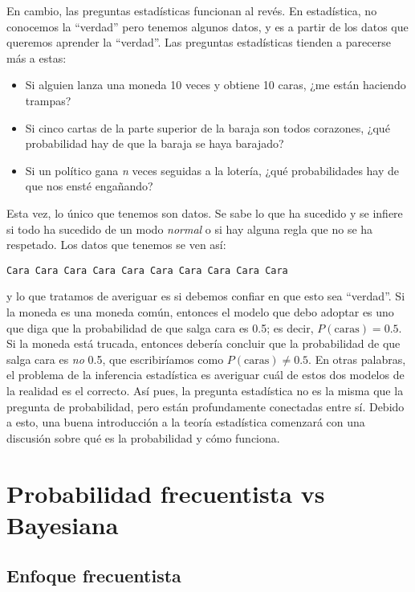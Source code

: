 \documentclass[
]{book}
\providecommand{\tightlist}{%
  \setlength{\itemsep}{0pt}\setlength{\parskip}{0pt}}
\begin{document}
En cambio, las preguntas estadísticas funcionan al revés. En estadística, no conocemos la ``verdad'' pero tenemos algunos datos, y es a partir de los datos que queremos aprender la ``verdad''. Las preguntas estadísticas tienden a parecerse más a estas:

\begin{itemize}
\tightlist
\item
  Si alguien lanza una moneda 10 veces y obtiene 10 caras, ¿me están haciendo trampas?
\item
  Si cinco cartas de la parte superior de la baraja son todos corazones, ¿qué probabilidad hay de que la baraja se haya barajado?
\item
  Si un político gana \emph{n} veces seguidas a la lotería, ¿qué probabilidades hay de que nos ensté engañando?
\end{itemize}

Esta vez, lo único que tenemos son datos. Se sabe lo que ha sucedido y se infiere si todo ha sucedido de un modo \emph{normal} o si hay alguna regla que no se ha respetado. Los datos que tenemos se ven así:

\begin{verbatim}
Cara Cara Cara Cara Cara Cara Cara Cara Cara Cara
\end{verbatim}

y lo que tratamos de averiguar es si debemos confiar en que esto sea ``verdad''. Si la moneda es una moneda común, entonces el modelo que debo adoptar es uno que diga que la probabilidad de que salga cara es 0.5; es decir, \(P(\mbox{caras}) = 0.5\). Si la moneda está trucada, entonces debería concluir que la probabilidad de que salga cara es \emph{no} 0.5, que escribiríamos como \(P(\mbox{caras})\neq0.5\). En otras palabras, el problema de la inferencia estadística es averiguar cuál de estos dos modelos de la realidad es el correcto. Así pues, la pregunta estadística no es la misma que la pregunta de probabilidad, pero están profundamente conectadas entre sí. Debido a esto, una buena introducción a la teoría estadística comenzará con una discusión sobre qué es la probabilidad y cómo funciona.

\hypertarget{probabilidad-frecuentista-vs-bayesiana}{%
\section{Probabilidad frecuentista vs Bayesiana}\label{probabilidad-frecuentista-vs-bayesiana}}

\hypertarget{enfoque-frecuentista}{%
\subsection{Enfoque frecuentista}\label{enfoque-frecuentista}}
\end{document}
